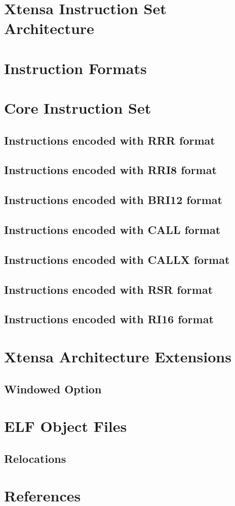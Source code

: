 \documentclass[oneside,11pt]{book}
\begin{document}
	
\chapter*{Xtensa Instruction Set Architecture}



\chapter*{Instruction Formats}



\chapter*{Core Instruction Set}

\section*{Instructions encoded with RRR format}

\newpage
\section*{Instructions encoded with RRI8 format}

\newpage
\section*{Instructions encoded with BRI12 format}

\newpage
\section*{Instructions encoded with CALL format}

\section*{Instructions encoded with CALLX format}

\newpage
\section*{Instructions encoded with RSR format}

\section*{Instructions encoded with RI16 format}


\newpage
\chapter*{Xtensa Architecture Extensions}

\section*{Windowed Option}


\chapter*{ELF Object Files}
\section*{Relocations}


\chapter*{References}

\end{document}
